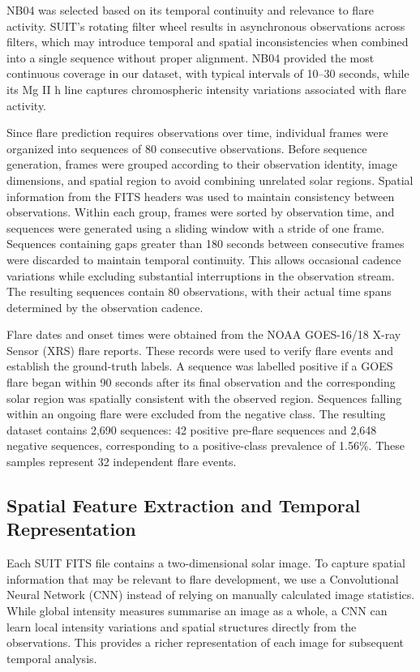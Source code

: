 \documentclass[oneside]{ieeeaccess}
\begin{document}
NB04 was selected based on its temporal continuity and relevance to flare activity. SUIT's rotating filter wheel results in asynchronous observations across filters, which may introduce temporal and spatial inconsistencies when combined into a single sequence without proper alignment. NB04 provided the most continuous coverage in our dataset, with typical intervals of 10--30 seconds, while its Mg II h line captures chromospheric intensity variations associated with flare activity.

Since flare prediction requires observations over time, individual frames were organized into sequences of 80 consecutive observations. Before sequence generation, frames were grouped according to their observation identity, image dimensions, and spatial region to avoid combining unrelated solar regions. Spatial information from the FITS headers was used to maintain consistency between observations. Within each group, frames were sorted by observation time, and sequences were generated using a sliding window with a stride of one frame. Sequences containing gaps greater than 180 seconds between consecutive frames were discarded to maintain temporal continuity. This allows occasional cadence variations while excluding substantial interruptions in the observation stream. The resulting sequences contain 80 observations, with their actual time spans determined by the observation cadence.

Flare dates and onset times were obtained from the NOAA GOES-16/18 X-ray Sensor (XRS) flare reports. These records were used to verify flare events and establish the ground-truth labels. A sequence was labelled positive if a GOES flare began within 90 seconds after its final observation and the corresponding solar region was spatially consistent with the observed region. Sequences falling within an ongoing flare were excluded from the negative class. The resulting dataset contains 2,690 sequences: 42 positive pre-flare sequences and 2,648 negative sequences, corresponding to a positive-class prevalence of 1.56\%. These samples represent 32 independent flare events.

\subsection{Spatial Feature Extraction and Temporal Representation}

Each SUIT FITS file contains a two-dimensional solar image. To capture spatial information that may be relevant to flare development, we use a Convolutional Neural Network (CNN) instead of relying on manually calculated image statistics. While global intensity measures summarise an image as a whole, a CNN can learn local intensity variations and spatial structures directly from the observations. This provides a richer representation of each image for subsequent temporal analysis.
\end{document}
